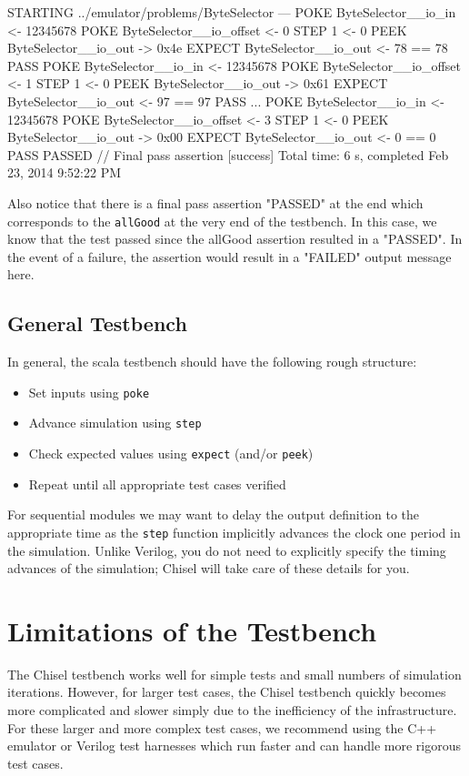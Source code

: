 \begin{bash}
STARTING ../emulator/problems/ByteSelector
---
POKE ByteSelector__io_in <- 12345678
POKE ByteSelector__io_offset <- 0
STEP 1 <- 0
PEEK ByteSelector__io_out -> 0x4e
EXPECT ByteSelector__io_out <- 78 == 78 PASS
POKE ByteSelector__io_in <- 12345678
POKE ByteSelector__io_offset <- 1
STEP 1 <- 0
PEEK ByteSelector__io_out -> 0x61
EXPECT ByteSelector__io_out <- 97 == 97 PASS
...
POKE ByteSelector__io_in <- 12345678
POKE ByteSelector__io_offset <- 3
STEP 1 <- 0
PEEK ByteSelector__io_out -> 0x00
EXPECT ByteSelector__io_out <- 0 == 0 PASS
PASSED   // Final pass assertion
[success] Total time: 6 s, completed Feb 23, 2014 9:52:22 PM
\end{bash}

Also notice that there is a final pass assertion "PASSED" at the end which corresponds to the \verb+allGood+ at the very end of the testbench. In this case, we know that the test passed since the allGood assertion resulted in a "PASSED". In the event of a failure, the assertion would result in a "FAILED" output message here.

\subsection{General Testbench}

In general, the scala testbench should have the following rough structure:

\begin{itemize}
\item Set inputs using \verb+poke+
\item Advance simulation using \verb+step+
\item Check expected values using \verb+expect+ (and/or \verb+peek+)
\item Repeat until all appropriate test cases verified
\end{itemize}

For sequential modules we may want to delay the output definition to the appropriate time as the \verb+step+ function implicitly advances the clock one period in the simulation. Unlike Verilog, you do not need to explicitly specify the timing advances of the simulation; Chisel will take care of these details for you.

\section{Limitations of the Testbench}

The Chisel testbench works well for simple tests and small numbers of simulation iterations. However, for larger test cases, the Chisel testbench quickly becomes more complicated and slower simply due to the inefficiency of the infrastructure. For these larger and more complex test cases, we recommend using the C++ emulator or Verilog test harnesses which run faster and can handle more rigorous test cases.

